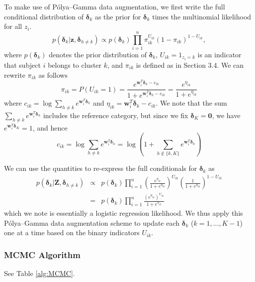 \documentclass[useAMS,referee]{biom}
\begin{document}
To make use of P\'olya--Gamma data augmentation, we first write the full conditional distribution of $\boldsymbol\delta_k$ as the prior for $\boldsymbol\delta_k$ times the multinomial likelihood for all $z_i$. $$p(\boldsymbol\delta_k|\mathbf{z},\boldsymbol\delta_{h \ne k}) \propto p(\boldsymbol\delta_k) \prod_{i = 1}^{n} \pi_{ik}^{U_{ik}}(1-\pi_{ik})^{1-U_{ik}},$$
where $p(\boldsymbol\delta_k)$ denotes the prior distribution of $\boldsymbol\delta_k$, $U_{ik} = {1}_{z_i = k}$ is an indicator that subject $i$ belongs to cluster $k$, and $\pi_{ik}$ is defined as in Section 3.4. We can rewrite $\pi_{ik}$ as follows
$$\pi_{ik} = P(U_{ik} = 1) = \frac{e^{\mathbf{w}_i^T \boldsymbol\delta_k - {c}_{ik}}}{1 + e^{\mathbf{w}_i^T \boldsymbol\delta_k - {c}_{ik}}} = \frac{e^{\eta_{ik}}}{1 + e^{\eta_{ik}}}$$
where ${c}_{ik} = \log \sum_{h \ne k} e^{\mathbf{w}_i^T \boldsymbol\delta_{h}}$ and $\eta_{ik} = \mathbf{w}_i^T \boldsymbol\delta_k - {c}_{ik}$. We note that the sum $\sum_{h \ne k} e^{\mathbf{w}_i^T \boldsymbol\delta_{h}}$ includes the reference category, but since we fix $\boldsymbol\delta_K = \mathbf{0}$, we have $e^{\mathbf{w}_i^T \boldsymbol\delta_K} = 1$, and hence
$$c_{ik} = \log \sum_{h \ne k} e^{\mathbf{w}_i^T \boldsymbol\delta_{h}} = \log \left ( 1 + \sum_{h \notin \{k,K \}} e^{\mathbf{w}_i^T \boldsymbol\delta_{h}} \right )$$

We can use the quantities to re-express the full conditionals for $\boldsymbol\delta_k$ as
\begin{eqnarray}
	p(\boldsymbol\delta_k|\mathbf{Z},\boldsymbol\delta_{h \ne k}) &\propto& p(\boldsymbol\delta_k) \prod_{i = 1}^{n} \left (\frac{e^{\eta_{ik}}}{1 + e^{\eta_{ik}}} \right )^{U_{ik}} \left (\frac{1}{1 + e^{\eta_{ik}}} \right )^{1-U_{ik}} \nonumber\\ &=& p(\boldsymbol\delta_k) \prod_{i = 1}^n \frac{(e^{\eta_{ik}})^{U_{ik}}}{1 + e^{\eta_{ik}}} \label{eq:pglogit}
\end{eqnarray}
which we note is essentially a logistic regression likelihood. We thus apply this P\'olya--Gamma data augmentation scheme to update each $\boldsymbol\delta_k$ ($k = 1,...,K-1$) one at a time based on the binary indicators $U_{ik}$.

\subsubsection{MCMC Algorithm}

See Table \ref{alg:MCMC}.
\end{document}
